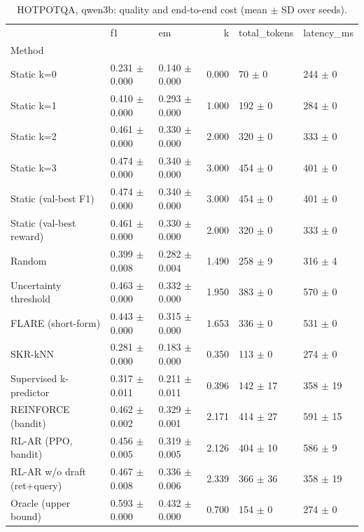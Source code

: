 \begin{table}
\caption{HOTPOTQA, qwen3b: quality and end-to-end cost (mean $\pm$ SD over seeds).}
\begin{tabular}{lllrll}
\toprule
 & f1 & em & k & total_tokens & latency_ms \\
Method &  &  &  &  &  \\
\midrule
Static k=0 & 0.231 $\pm$ 0.000 & 0.140 $\pm$ 0.000 & 0.000 & 70 $\pm$ 0 & 244 $\pm$ 0 \\
Static k=1 & 0.410 $\pm$ 0.000 & 0.293 $\pm$ 0.000 & 1.000 & 192 $\pm$ 0 & 284 $\pm$ 0 \\
Static k=2 & 0.461 $\pm$ 0.000 & 0.330 $\pm$ 0.000 & 2.000 & 320 $\pm$ 0 & 333 $\pm$ 0 \\
Static k=3 & 0.474 $\pm$ 0.000 & 0.340 $\pm$ 0.000 & 3.000 & 454 $\pm$ 0 & 401 $\pm$ 0 \\
Static (val-best F1) & 0.474 $\pm$ 0.000 & 0.340 $\pm$ 0.000 & 3.000 & 454 $\pm$ 0 & 401 $\pm$ 0 \\
Static (val-best reward) & 0.461 $\pm$ 0.000 & 0.330 $\pm$ 0.000 & 2.000 & 320 $\pm$ 0 & 333 $\pm$ 0 \\
Random & 0.399 $\pm$ 0.008 & 0.282 $\pm$ 0.004 & 1.490 & 258 $\pm$ 9 & 316 $\pm$ 4 \\
Uncertainty threshold & 0.463 $\pm$ 0.000 & 0.332 $\pm$ 0.000 & 1.950 & 383 $\pm$ 0 & 570 $\pm$ 0 \\
FLARE (short-form) & 0.443 $\pm$ 0.000 & 0.315 $\pm$ 0.000 & 1.653 & 336 $\pm$ 0 & 531 $\pm$ 0 \\
SKR-kNN & 0.281 $\pm$ 0.000 & 0.183 $\pm$ 0.000 & 0.350 & 113 $\pm$ 0 & 274 $\pm$ 0 \\
Supervised k-predictor & 0.317 $\pm$ 0.011 & 0.211 $\pm$ 0.011 & 0.396 & 142 $\pm$ 17 & 358 $\pm$ 19 \\
REINFORCE (bandit) & 0.462 $\pm$ 0.002 & 0.329 $\pm$ 0.001 & 2.171 & 414 $\pm$ 27 & 591 $\pm$ 15 \\
RL-AR (PPO, bandit) & 0.456 $\pm$ 0.005 & 0.319 $\pm$ 0.005 & 2.126 & 404 $\pm$ 10 & 586 $\pm$ 9 \\
RL-AR w/o draft (ret+query) & 0.467 $\pm$ 0.008 & 0.336 $\pm$ 0.006 & 2.339 & 366 $\pm$ 36 & 358 $\pm$ 19 \\
Oracle (upper bound) & 0.593 $\pm$ 0.000 & 0.432 $\pm$ 0.000 & 0.700 & 154 $\pm$ 0 & 274 $\pm$ 0 \\
\bottomrule
\end{tabular}
\end{table}
